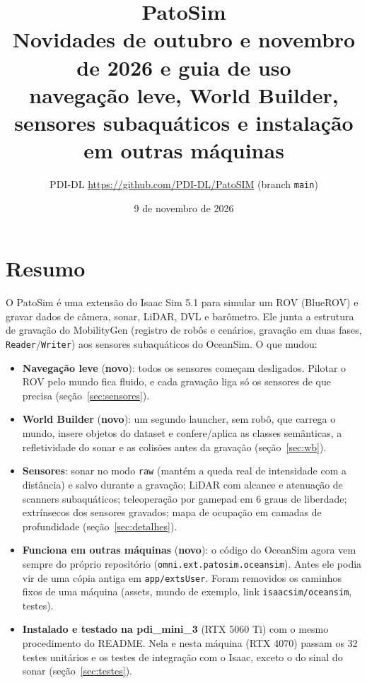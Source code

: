 \documentclass[10pt,a4paper]{article}
\title{\textbf{PatoSim}\\[2pt]
\large Novidades de outubro e novembro de 2026 e guia de uso\\
\normalsize navegação leve, World Builder, sensores subaquáticos e instalação em outras máquinas}
\author{PDI-DL \textendash{} \url{https://github.com/PDI-DL/PatoSIM} (branch \texttt{main})}
\date{9 de novembro de 2026}
\newcommand{\arq}[1]{\texttt{#1}}
\newcommand{\novo}{\textcolor{novo}{\textbf{novo}}}
\begin{document}
\maketitle
\vspace{-1.2em}

\section*{Resumo}
O PatoSim é uma extensão do Isaac Sim 5.1 para simular um ROV (BlueROV) e gravar dados de câmera, sonar,
LiDAR, DVL e barômetro. Ele junta a estrutura de gravação do MobilityGen (registro de robôs e cenários,
gravação em duas fases, \arq{Reader}/\arq{Writer}) aos sensores subaquáticos do OceanSim.
O que mudou:
\begin{itemize}
  \item \textbf{Navegação leve} (\novo): todos os sensores começam desligados. Pilotar o ROV pelo mundo fica
        fluido, e cada gravação liga só os sensores de que precisa (seção~\ref{sec:sensores}).
  \item \textbf{World Builder} (\novo): um segundo launcher, sem robô, que carrega o mundo, insere objetos do
        dataset e confere/aplica as classes semânticas, a refletividade do sonar e as colisões antes da
        gravação (seção~\ref{sec:wb}).
  \item \textbf{Sensores}: sonar no modo \texttt{raw} (mantém a queda real de intensidade com a distância) e
        salvo durante a gravação; LiDAR com alcance e atenuação de scanners subaquáticos; teleoperação por
        gamepad em 6 graus de liberdade; extrínsecos dos sensores gravados; mapa de ocupação em camadas de
        profundidade (seção~\ref{sec:detalhes}).
  \item \textbf{Funciona em outras máquinas} (\novo): o código do OceanSim agora vem sempre do próprio repositório
        (\arq{omni.ext.patosim.oceansim}). Antes ele podia vir de uma cópia antiga em \arq{app/extsUser}. Foram
        removidos os caminhos fixos de uma máquina (assets, mundo de exemplo, link \arq{isaacsim/oceansim}, testes).
  \item \textbf{Instalado e testado na pdi\_mini\_3} (RTX 5060 Ti) com o mesmo procedimento do README. Nela e nesta
        máquina (RTX 4070) passam os 32 testes unitários e os testes de integração com o Isaac, exceto o do sinal
        do sonar (seção~\ref{sec:testes}).
\end{itemize}
\end{document}
